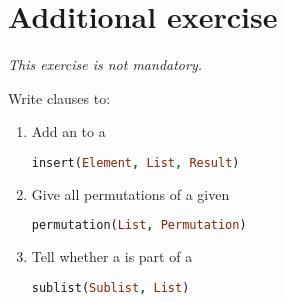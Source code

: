\documentclass{../../../tp}
\begin{document}
\section{Additional exercise}
\begin{flushright}
	\small
	\itshape
	This exercise is not mandatory.
\end{flushright}


\begin{instruction}
	Write clauses to:
	\begin{enumerate}
		
	\item Add an to a  
	\begin{lstlisting}[language=prolog] 
	insert(Element, List, Result) 
	\end{lstlisting}
	
	\item  Give all permutations of a given 
	\begin{lstlisting}[language=prolog] 
	permutation(List, Permutation) 
	\end{lstlisting}
	
	
	\item Tell whether a  is part of a 
	\begin{lstlisting}[language=prolog] 
	sublist(Sublist, List) 
	\end{lstlisting}
	
	\end{enumerate}
	
\end{instruction}
\end{document}
